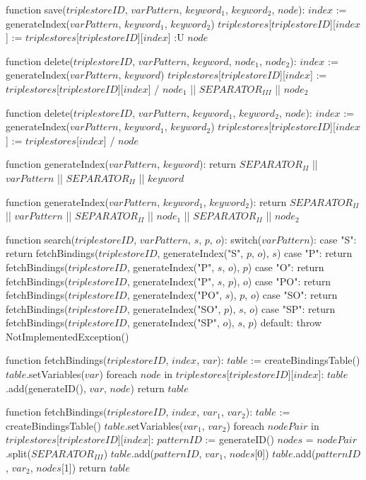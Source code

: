 function save($triplestoreID$, $varPattern$, $keyword_1$, $keyword_2$, $node$):
    $index$ := generateIndex($varPattern$, $keyword_1$, $keyword_2$)
    $triplestores$[$triplestoreID$][$index$] := $triplestores$[$triplestoreID$][$index$] :U { $node$ }

function delete($triplestoreID$, $varPattern$, $keyword$, $node_1$, $node_2$):
    $index$ := generateIndex($varPattern$, $keyword$)
    $triplestores$[$triplestoreID$][$index$] := $triplestores$[$triplestoreID$][$index$] / { $node_1$ || $SEPARATOR_{III}$ || $node_2$ }

function delete($triplestoreID$, $varPattern$, $keyword_1$, $keyword_2$, $node$):
    $index$ := generateIndex($varPattern$, $keyword_1$, $keyword_2$)
    $triplestores$[$triplestoreID$][$index$] := $triplestores$[$index$] / { $node$ }

function generateIndex($varPattern$, $keyword$):
    return $SEPARATOR_{II}$ || $varPattern$ || $SEPARATOR_{II}$ || $keyword$ 

function generateIndex($varPattern$, $keyword_1$, $keyword_2$):
    return $SEPARATOR_{II}$ || $varPattern$ || $SEPARATOR_{II}$ || $node_1$ || $SEPARATOR_{II}$ || $node_2$

function search($triplestoreID$, $varPattern$, $s$, $p$, $o$):
    switch($varPattern$):
        case "S": return fetchBindings($triplestoreID$, generateIndex("S", $p$, $o$), $s$)
        case "P": return fetchBindings($triplestoreID$, generateIndex("P", $s$, $o$), $p$)
        case "O": return fetchBindings($triplestoreID$, generateIndex("P", $s$, $p$), $o$)
        case "PO": return fetchBindings($triplestoreID$, generateIndex("PO", $s$), $p$, $o$)
        case "SO": return fetchBindings($triplestoreID$, generateIndex("SO", $p$), $s$, $o$)
        case "SP": return fetchBindings($triplestoreID$, generateIndex("SP", $o$), $s$, $p$)
        default: throw NotImplementedException()

function fetchBindings($triplestoreID$, $index$, $var$):
    $table$ := createBindingsTable()
    $table$.setVariables({$var$})
    foreach $node$ in $triplestores$[$triplestoreID$][$index$]:
        $table$.add(generateID(), $var$, $node$)
    return $table$

function fetchBindings($triplestoreID$, $index$, $var_1$, $var_2$):
    $table$ := createBindingsTable()
    $table$.setVariables({$var_1$, $var_2$})
    foreach $nodePair$ in $triplestores$[$triplestoreID$][$index$]:
        $patternID$ := generateID()               
        $nodes$ = $nodePair$.split($SEPARATOR_{III}$)
        $table$.add($patternID$, $var_1$, $nodes$[0])
        $table$.add($patternID$, $var_2$, $nodes$[1])
    return $table$

